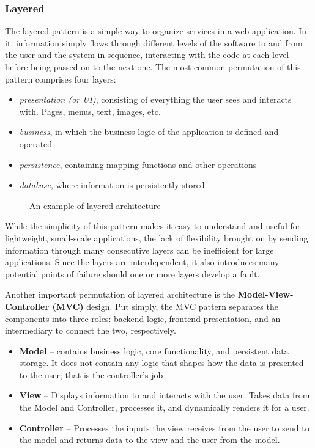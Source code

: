 \subsubsection{Layered}

The layered pattern is a simple way to organize services in a web application. In it, information simply flows through different levels of the software to and from the user and the system in sequence, interacting with the code at each level before being passed on to the next one. The most common permutation of this pattern comprises four layers:
\begin{itemize}
	\item \emph{presentation (or UI)}, consisting of everything the user sees and interacts with. Pages, menus, text, images, etc.
	\item \emph{business}, in which the business logic of the application is defined and operated
	\item \emph{persistence}, containing mapping functions and other operations 
	\item \emph{database}, where information is persistently stored
\end{itemize}

\begin{figure}[!ht]
	\begin{center}
		\caption{An example of layered architecture}\label{layered}
	\end{center}
\end{figure}

While the simplicity of this pattern makes it easy to understand and useful for lightweight, small-scale applications, the lack of flexibility brought on by sending information through many consecutive layers can be inefficient for large applications. Since the layers are interdependent, it also introduces many potential points of failure should one or more layers develop a fault.

Another important permutation of layered architecture is the \textbf{Model-View-Controller (MVC)} design. Put simply, the MVC pattern separates the components into three roles: backend logic, frontend presentation, and an intermediary to connect the two, respectively.
\begin{itemize}
	\item \textbf{Model} -- contains business logic, core functionality, and persistent data storage. It does not contain any logic that shapes how the data is presented to the user; that is the controller’s job
	\item \textbf{View} -- Displays information to and interacts with the user. Takes data from the Model and Controller, processes it, and dynamically renders it for a user.
	\item \textbf{Controller} -- Processes the inputs the view receives from the user to send to the model and returns data to the view and the user from the model.
\end{itemize}

